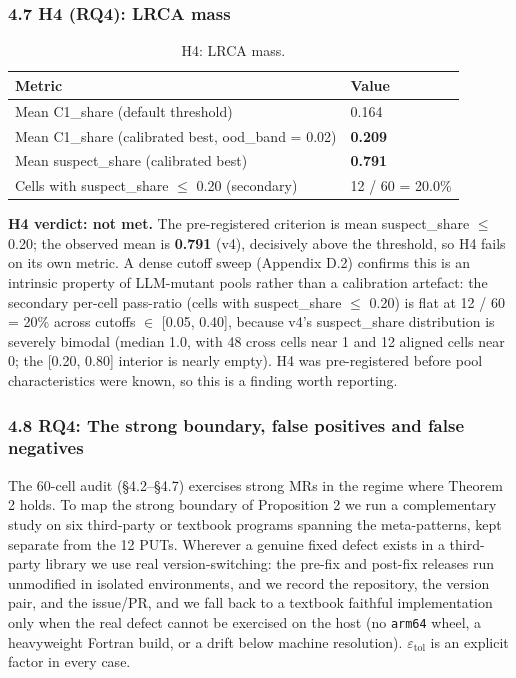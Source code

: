 \documentclass[review,12pt,authoryear]{elsarticle}
\begin{document}
\subsubsection{4.7 H4 (RQ4): LRCA mass}\label{h5-lrca-mass}

{\def\LTcaptype{table} %
\begin{longtable}[]{@{}ll@{}}
\caption{H4: LRCA mass.}\label{tab:p2-13}\\
\toprule\noalign{}
Metric & Value \\
\midrule\noalign{}
\endhead
\bottomrule\noalign{}
\endlastfoot
Mean C1\_share (default threshold) & 0.164 \\
Mean C1\_share (calibrated best, ood\_band = 0.02) & \textbf{0.209} \\
Mean suspect\_share (calibrated best) & \textbf{0.791} \\
Cells with suspect\_share $\leq$ 0.20 (secondary) & 12 / 60 = 20.0\% \\
\end{longtable}
}

\textbf{H4 verdict: not met.} The pre-registered criterion is mean
suspect\_share $\leq$ 0.20; the observed mean is \textbf{0.791} (v4),
decisively above the threshold, so H4 fails on its own metric. A dense
cutoff sweep (Appendix D.2) confirms this is an intrinsic property of
LLM-mutant pools rather than a calibration artefact: the secondary
per-cell pass-ratio (cells with suspect\_share $\leq$ 0.20) is flat at
12 / 60 = 20\% across cutoffs $\in$ {[}0.05, 0.40{]}, because v4's
suspect\_share distribution is severely bimodal (median 1.0, with 48
cross cells near 1 and 12 aligned cells near 0; the {[}0.20, 0.80{]}
interior is nearly empty). H4 was pre-registered before pool
characteristics were known, so this is a finding worth reporting.

\subsubsection{4.8 RQ4: The strong boundary, false positives and false negatives}\label{rq4-strong-boundary}

The 60-cell audit (§4.2--§4.7) exercises strong MRs in the regime where
Theorem 2 holds. To map the strong boundary of Proposition 2 we run a
complementary study on six third-party or textbook programs spanning the
meta-patterns, kept separate from the 12 PUTs. Wherever a genuine fixed
defect exists in a third-party library we use real version-switching:
the pre-fix and post-fix releases run unmodified in isolated environments,
and we record the repository, the version pair, and the issue/PR, and
we fall back to a textbook faithful implementation only when the real
defect cannot be exercised on the host (no \texttt{arm64} wheel, a
heavyweight Fortran build, or a drift below machine resolution).
$\varepsilon_{\mathrm{tol}}$ is an explicit factor in every case.
\end{document}
